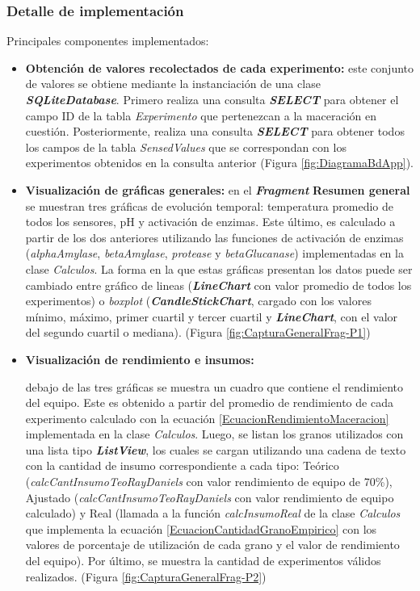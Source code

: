             \subsubsection{Detalle de implementación}
             \par Principales componentes implementados:
             \begin{itemize}
                 \item \textbf{Obtención de valores recolectados de cada experimento:} este conjunto de valores se obtiene mediante la instanciación de una clase \textbf{\textit{\gls{SQLiteDatabase}}}. Primero realiza una consulta \textbf{\textit{\gls{SELECT}}} para obtener el campo ID de la tabla \textit{Experimento} que pertenezcan a la maceración en cuestión. Posteriormente, realiza una consulta \textbf{\textit{\gls{SELECT}}} para obtener todos los campos de la tabla \textit{SensedValues} que se correspondan con los experimentos obtenidos en la consulta anterior (Figura \ref{fig:DiagramaBdApp}).
                 
                 \item \textbf{Visualización de gráficas generales:} en el \textbf{\textit{\gls{Fragment}}} \textbf{Resumen general} se muestran tres gráficas de evolución temporal: temperatura promedio de todos los sensores, pH y activación de enzimas. Este último, es calculado a partir de los dos anteriores utilizando las funciones de activación de enzimas (\textit{alphaAmylase}, \textit{betaAmylase}, \textit{protease} y \textit{betaGlucanase}) implementadas en la clase \textit{Calculos}. La forma en la que estas gráficas presentan los datos puede ser cambiado entre gráfico de lineas (\textbf{\textit{\gls{LineChart}}} con valor promedio de todos los experimentos) o \textit{boxplot} (\textbf{\textit{\gls{CandleStickChart}}}, cargado con los valores mínimo, máximo, primer cuartil y tercer cuartil y \textbf{\textit{\gls{LineChart}}}, con el valor del segundo cuartil o mediana). (Figura \ref{fig:CapturaGeneralFrag-P1})
                 
                 \item \textbf{Visualización de rendimiento e insumos:} \par debajo de las tres gráficas se muestra un cuadro que contiene el rendimiento del equipo. Este es obtenido a partir del promedio de rendimiento de cada experimento calculado con la ecuación \ref{EcuacionRendimientoMaceracion} implementada en la clase \textit{Calculos}. Luego, se listan los granos utilizados con una lista tipo \textbf{\textit{\gls{ListView}}}, los cuales se cargan utilizando una cadena de texto con la cantidad de insumo correspondiente a cada tipo: Teórico (\textit{calcCantInsumoTeoRayDaniels} con valor rendimiento de equipo de 70\%), Ajustado (\textit{calcCantInsumoTeoRayDaniels} con valor rendimiento de equipo calculado) y Real (llamada a la función \textit{calcInsumoReal} de la clase \textit{Calculos} que implementa la ecuación  \ref{EcuacionCantidadGranoEmpirico} con los valores de porcentaje de utilización de cada grano y el valor de rendimiento del equipo). Por último, se muestra la cantidad de experimentos válidos realizados. (Figura \ref{fig:CapturaGeneralFrag-P2})
                 

\end{itemize}
